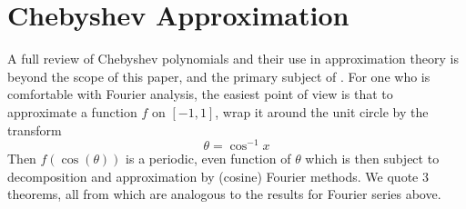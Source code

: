




\section{Chebyshev Approximation\label{Chebyshev}}
A full review of Chebyshev polynomials and their use in approximation theory is beyond the scope of this paper, and the primary subject of \cite{trefethenATAP}.  For one who is comfortable with Fourier analysis, the easiest point of view is that to approximate a function $f$ on $[-1,1]$, wrap it around the unit circle by the transform
\[ \theta = \cos^{-1} x \]
Then $f(\cos(\theta))$ is a periodic, even function  of $\theta$ which is then subject to decomposition and approximation by (cosine) Fourier methods.  We quote 3 theorems, all from \cite{trefethenATAP} which are analogous to the results for Fourier series above. \\

